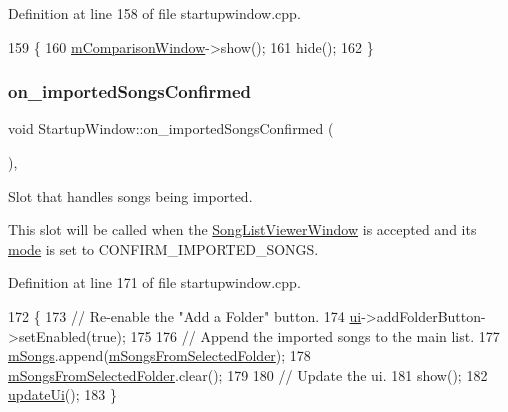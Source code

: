 Definition at line 158 of file startupwindow.\+cpp.


\begin{DoxyCode}
159 \{
160     \mbox{\hyperlink{class_startup_window_a674395b4edbe76568be4f0f4c7577ac1}{mComparisonWindow}}->show();
161     hide();
162 \}
\end{DoxyCode}
\mbox{\label{class_startup_window_ac4235050012186e44fbc4e3e3c990d81}} 
\subsubsection{\texorpdfstring{on\+\_\+imported\+Songs\+Confirmed}{on\_importedSongsConfirmed}}
{\footnotesize\ttfamily void Startup\+Window\+::on\+\_\+imported\+Songs\+Confirmed (\begin{DoxyParamCaption}{ }\end{DoxyParamCaption})\hspace{0.3cm}{\ttfamily [private]}, {\ttfamily [slot]}}



Slot that handles songs being imported. 

This slot will be called when the \mbox{\hyperlink{class_song_list_viewer_window}{Song\+List\+Viewer\+Window}} is accepted and its \mbox{\hyperlink{class_song_list_viewer_window_a6f23a68c416173f6b571a2cc4990a927}{mode}} is set to C\+O\+N\+F\+I\+R\+M\+\_\+\+I\+M\+P\+O\+R\+T\+E\+D\+\_\+\+S\+O\+N\+GS. 

Definition at line 171 of file startupwindow.\+cpp.


\begin{DoxyCode}
172 \{
173     \textcolor{comment}{// Re-enable the "Add a Folder" button.}
174     \mbox{\hyperlink{class_startup_window_a5afeeaabe9a34a02a67d2e7d9f36dc09}{ui}}->addFolderButton->setEnabled(\textcolor{keyword}{true});
175 
176     \textcolor{comment}{// Append the imported songs to the main list.}
177     \mbox{\hyperlink{class_startup_window_ae57241505d74639131cb0ece2cfc922b}{mSongs}}.append(\mbox{\hyperlink{class_startup_window_af419f4809f6fae0b370f1d9112dae9b4}{mSongsFromSelectedFolder}});
178     \mbox{\hyperlink{class_startup_window_af419f4809f6fae0b370f1d9112dae9b4}{mSongsFromSelectedFolder}}.clear();
179 
180     \textcolor{comment}{// Update the ui.}
181     show();
182     \mbox{\hyperlink{class_startup_window_a910d56e4b640d6b7b27a6de2ae18d736}{updateUi}}();
183 \}
\end{DoxyCode}
\mbox{\label{class_startup_window_a18e7e279255ae11a1121f880d597dae9}} 

